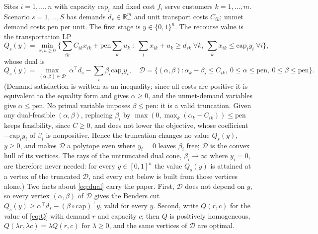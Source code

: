 \documentclass[11pt]{article}
\newcommand{\capa}{\mathrm{cap}}
\newcommand{\pen}{\mathrm{pen}}
\newcommand{\D}{\mathcal{D}}
\newcommand{\T}{^{\top}}
\begin{document}
Sites $i = 1,\dots,n$ with capacity $\capa_i$ and fixed cost $f_i$ serve customers $k = 1,\dots,m$. Scenario
$s = 1,\dots,S$ has demands $d_s \in \mathbb{R}^m_{+}$ and unit transport costs $C_{ik}$; unmet demand costs $\pen$ per
unit. The first stage is $y \in \{0,1\}^n$. The recourse value is the transportation LP
\begin{equation}\label{eq:Q}
Q_s(y) = \min_{x,u\ge 0}\Big\{ \sum_{ik} C_{ik}x_{ik} + \pen\sum_k u_k \;:\; \sum_i x_{ik} + u_k \ge d_{sk}\ \forall k,\
\sum_k x_{ik} \le \capa_i y_i\ \forall i \Big\},
\end{equation}
whose dual is
\begin{equation}\label{eq:dual}
Q_s(y) = \max_{(\alpha,\beta)\in\D}\ \alpha\T d_s - \sum_i \beta_i \capa_i y_i,\quad
\D = \{(\alpha,\beta): \alpha_k - \beta_i \le C_{ik},\ 0 \le \alpha \le \pen,\ 0 \le \beta \le \pen\}.
\end{equation}
(Demand satisfaction is written as an inequality; since all costs are positive it is equivalent to the equality
form and gives $\alpha\ge0$, and the unmet-demand variables give $\alpha\le\pen$. No primal variable imposes
$\beta\le\pen$: it is a valid truncation. Given any dual-feasible $(\alpha,\beta)$, replacing $\beta_i$ by
$\max(0,\max_k(\alpha_k - C_{ik}))\le\pen$ keeps feasibility, since $C\ge0$, and does not lower the objective, whose
coefficient $-\capa_iy_i$ of $\beta_i$ is nonpositive. Hence the truncation changes no value $Q_s(y)$, $y\ge0$, and
makes $\D$ a polytope even where $y_i = 0$ leaves $\beta_i$ free; $\D$ is the convex hull of its vertices. The rays
of the untruncated dual cone, $\beta_i\to\infty$ where $y_i = 0$, are therefore never needed: for every
$y\in[0,1]^n$ the value $Q_s(y)$ is attained at a vertex of the truncated $\D$, and every cut below is built from
those vertices alone.) Two facts about \eqref{eq:dual} carry the
paper. First, $\D$ does not depend on $y$, so every vertex $(\alpha,\beta)$ of $\D$ gives the Benders cut $Q_s(y) \ge \alpha\T d_s - (\beta\circ\capa)\T y$, valid for every $y$. Second, write
$Q(r, c)$ for the value of \eqref{eq:Q} with demand $r$ and capacity $c$; then $Q$ is positively homogeneous,
$Q(\lambda r, \lambda c) = \lambda Q(r, c)$ for $\lambda \ge 0$, and the same vertices of $\D$ are optimal.
\end{document}
